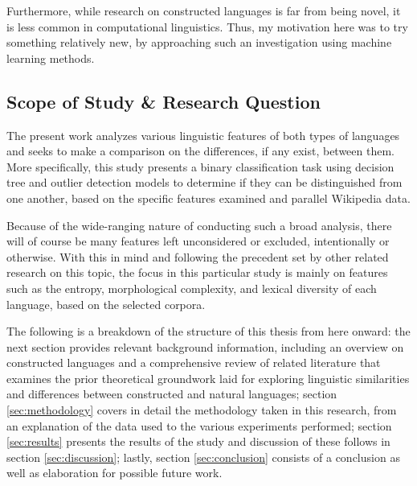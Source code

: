 \documentclass[12pt,a4paper]{article}
\numberwithin{figure}{section}
\numberwithin{table}{section}
\numberwithin{definition}{section}
\begin{document}
Furthermore, while research on constructed languages is far from being novel, it is less common in computational linguistics. Thus, my motivation here was to try something relatively new, by approaching such an investigation using machine learning methods. 

\subsection{Scope of Study \& Research Question}
\label{ssec:scope}


The present work analyzes various linguistic features of both types of languages and seeks to make a comparison on the differences, if any exist, between them. More specifically, this study presents a binary classification task using decision tree and outlier detection models to determine if they can be distinguished from one another, based on the specific features examined and parallel Wikipedia data. 

Because of the wide-ranging nature of conducting such a broad analysis, there will of course be many features left unconsidered or excluded, intentionally or otherwise. With this in mind and following the precedent set by other related research on this topic, the focus in this particular study is mainly on features such as the entropy, morphological complexity, and lexical diversity of each language, based on the selected corpora.

The following is a breakdown of the structure of this thesis from here onward: the next section provides relevant background information, including an overview on constructed languages and a comprehensive review of related literature that examines the prior theoretical groundwork laid for exploring linguistic similarities and differences between constructed and natural languages; section \ref{sec:methodology} covers in detail the methodology taken in this research, from an explanation of the data used to the various experiments performed; section \ref{sec:results} presents the results of the study and discussion of these follows in section \ref{sec:discussion}; lastly, section \ref{sec:conclusion} consists of a conclusion as well as elaboration for possible future work.
\end{document}
